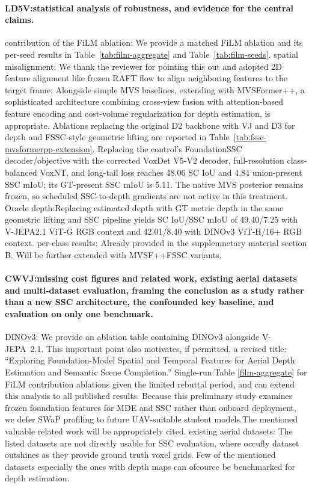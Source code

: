 \documentclass[10pt,twocolumn,letterpaper]{article}
\begin{document}
\paragraph{LD5V:statistical analysis of
robustness, and evidence for the central claims.}
contribution of the FiLM ablation: We provide a matched FiLM ablation and its per-seed results in Table~\ref{tab:film-aggregate} and Table~\ref{tab:film-seeds}.
spatial misalignment: We thank the reviewer for pointing this out and adopted 2D feature alignment like frozen RAFT flow to align neighboring features to the target frame;
Alongside simple MVS baselines, extending with MVSFormer++, a sophisticated architecture combining cross-view fusion with attention-based feature encoding and cost-volume regularization for depth estimation, is appropriate. Ablations replacing the original D2 backbone with VJ and D3 for depth and FSSC-style geometric lifting are reported in Table~\ref{tab:fssc-mvsformerpp-extension}. Replacing the control's FoundationSSC decoder/objective with the corrected VoxDet V5-V2 decoder, full-resolution class-balanced VoxNT, and long-tail loss reaches 48.06 SC IoU and 4.84 union-present SSC mIoU; its GT-present SSC mIoU is 5.11. The native MVS posterior remains frozen, so scheduled SSC-to-depth gradients are not active in this treatment.
Oracle depth:Replacing estimated depth with GT metric depth in the same geometric lifting
and SSC pipeline yields SC IoU/SSC mIoU of 49.40/7.25 with V-JEPA2.1 ViT-G RGB
context and 42.01/8.40 with DINOv3 ViT-H/16+ RGB context.
per-class results: Already provided in the supplemnetary material section B. Will be further extended with MVSF++FSSC variants.

\paragraph{CWVJ:missing cost figures and related work, existing
aerial datasets and multi-dataset evaluation, framing the conclusion as a
study rather than a new SSC architecture, the confounded key baseline, and
evaluation on only one benchmark.}
DINOv3: We provide an ablation table containing DINOv3 alongside V-JEPA~2.1.
This important point also motivates, if permitted, a revised title:
``Exploring Foundation-Model Spatial and Temporal Features for Aerial Depth
Estimation and Semantic Scene Completion.''
Single-run:Table \ref{film-aggregate} for FiLM contribution ablations given the
limited rebuttal period, and can extend this analysis to all published results.
Because this preliminary study examines frozen foundation features for MDE and SSC rather than onboard deployment, we defer SWaP profiling to future UAV-suitable student models.The mentioned valuable related work will be appropriately cited. 
existing aerial datasets: The listed datasets are not directly usable for SSC evaluation, where occufly dataset outshines as they provide ground truth voxel grids. Few of the mentioned datasets especially the ones with depth maps can ofcource be benchmarked for depth estimation.
\end{document}
